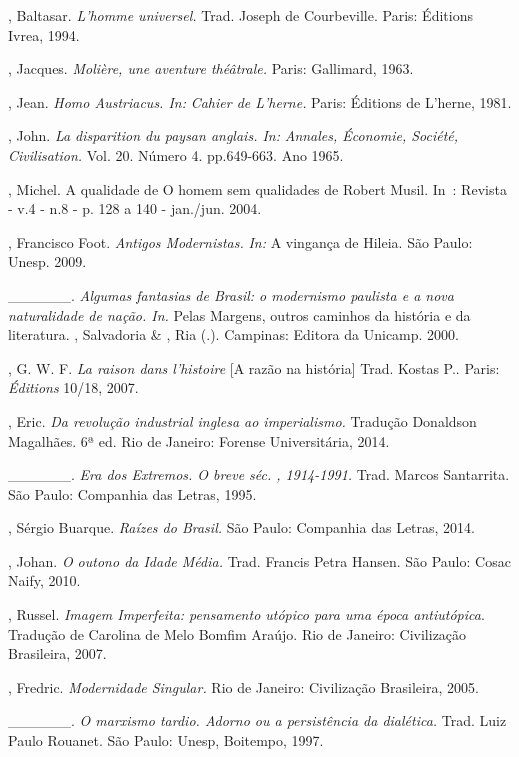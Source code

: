 {\begin{Parskip}
, Baltasar. \emph{L'homme universel.} Trad. Joseph de
Courbeville. Paris: Éditions Ivrea, 1994.

, Jacques. \emph{Molière, une aventure théâtrale.} Paris:
Gallimard, 1963.

, Jean. \emph{Homo Austriacus. In:} \emph{Cahier de L'herne.}
Paris: Éditions de L'herne, 1981.

, John. \emph{La disparition du paysan anglais. In:}
\emph{Annales, Économie, Société, Civilisation.} Vol. 20. Número 4.
pp.649-663. Ano 1965.

, Michel. A qualidade de O homem sem qualidades de Robert Musil.
In~: Revista  - v.4 - n.8 - p. 128 a 140 - jan./jun. 2004.

, Francisco Foot. \emph{Antigos Modernistas.} \emph{In:} A
vingança de Hileia. São Paulo: Unesp. 2009.

\_\_\_\_\_\_. \emph{Algumas fantasias de Brasil: o modernismo paulista e
a nova naturalidade de nação. In.} Pelas Margens, outros caminhos da
história e da literatura. , Salvadoria \& , Ria (.).
Campinas: Editora da Unicamp. 2000.

, G. W. F. \emph{La raison dans l'histoire} [A razão na
história] Trad. Kostas P.. Paris: \emph{Éditions} 10/18, 2007.

, Eric. \emph{Da revolução industrial inglesa ao
imperialismo.} Tradução Donaldson Magalhães. 6ª ed. Rio de Janeiro:
Forense Universitária, 2014.

\_\_\_\_\_\_. \emph{Era dos Extremos. O breve séc. , 1914-1991.}
Trad. Marcos Santarrita. São Paulo: Companhia das Letras, 1995.

, Sérgio Buarque. \emph{Raízes do Brasil.} São Paulo: Companhia
das Letras, 2014.

, Johan. \emph{O outono da Idade Média.} Trad. Francis Petra
Hansen. São Paulo: Cosac Naify, 2010.

, Russel. \emph{Imagem Imperfeita: pensamento utópico para uma
época antiutópica}. Tradução de Carolina de Melo Bomfim Araújo.
Rio de Janeiro: Civilização Brasileira, 2007.

, Fredric. \emph{Modernidade Singular.} Rio de Janeiro:
Civilização Brasileira, 2005.

\_\_\_\_\_\_. \emph{O marxismo tardio. Adorno ou a persistência da
dialética.} Trad. Luiz Paulo Rouanet. São Paulo: Unesp, Boitempo, 1997.


\end{Parskip}}

